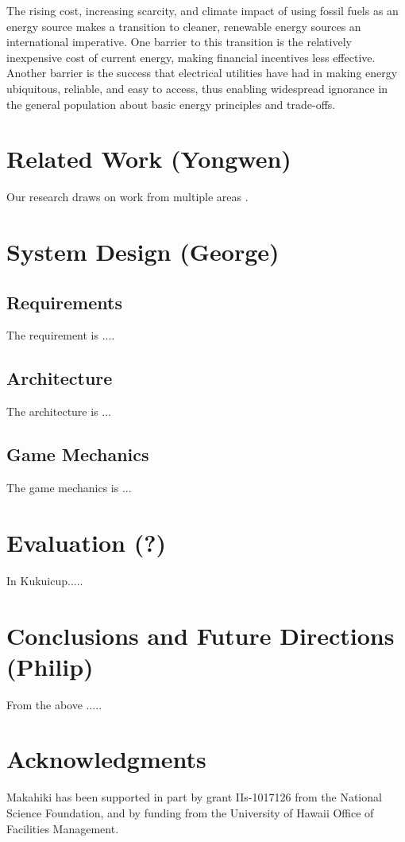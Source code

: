 \documentclass{acm_proc_article-sp}
\begin{document}
The rising cost, increasing scarcity, and climate impact of using fossil
fuels as an energy source makes a transition to cleaner, renewable energy
sources an international imperative.  One barrier to this transition is the
relatively inexpensive cost of current energy, making financial incentives
less effective.   Another barrier is the success that electrical utilities
have had in making energy ubiquitous, reliable, and easy to access, thus
enabling widespread ignorance in the general population about basic energy
principles and trade-offs.  


\section{Related Work (Yongwen)}
Our research draws on work from multiple areas \cite{csdl2-10-05,csdl2-10-07,csdl2-11-02,csdl2-11-03}.

\section{System Design (George)}

\subsection{Requirements}
The requirement is ....

\subsection{Architecture}
The architecture is ...

\subsection{Game Mechanics}
The game mechanics is ...

\section{Evaluation (?)}
In Kukuicup.....

\section{Conclusions and Future Directions (Philip)}
From the above .....

\section{Acknowledgments}
Makahiki has been supported in part by grant IIs-1017126 from the National
Science Foundation, and by funding from the University of Hawaii Office of Facilities
Management. 
%

  
%
%
\balancecolumns
\end{document}

